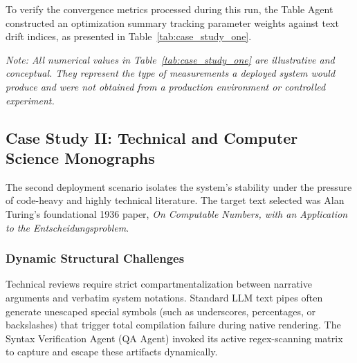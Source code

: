 To verify the convergence metrics processed during this run, the Table Agent constructed an optimization summary tracking parameter weights against text drift indices, as presented in Table~\ref{tab:case_study_one}.

\noindent\textit{Note: All numerical values in Table~\ref{tab:case_study_one} are illustrative and conceptual. They represent the type of measurements a deployed system would produce and were not obtained from a production environment or controlled experiment.}

\begin{table}[htbp]
\centering
\small
\caption{System Convergence and Evaluation Metrics for Case Study I (illustrative values).}
\label{tab:case_study_one}
\end{table}

\subsection{Case Study II: Technical and Computer Science Monographs}
The second deployment scenario isolates the system's stability under the pressure of code-heavy and highly technical literature. The target text selected was Alan Turing’s foundational 1936 paper, \textit{On Computable Numbers, with an Application to the Entscheidungsproblem}.

\subsubsection{Dynamic Structural Challenges}
Technical reviews require strict compartmentalization between narrative arguments and verbatim system notations. Standard LLM text pipes often generate unescaped special symbols (such as underscores, percentages, or backslashes) that trigger total compilation failure during native rendering. The Syntax Verification Agent (QA Agent) invoked its active regex-scanning matrix to capture and escape these artifacts dynamically.

